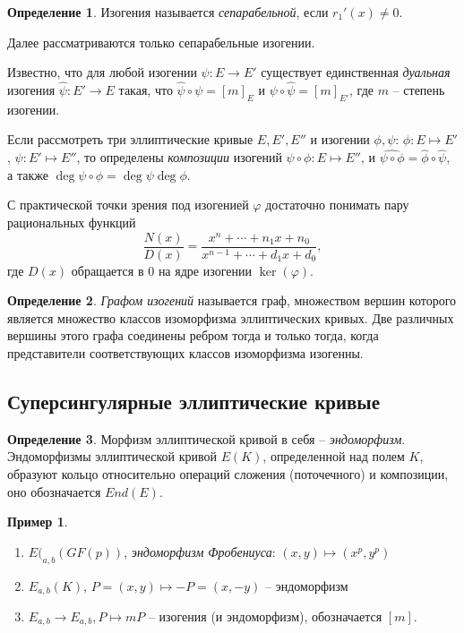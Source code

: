 \documentclass[a4paper,12pt]{article}
\theoremstyle{definition}
\newtheorem{definition}{Определение}
\newtheorem{example}{Пример}
\begin{document}
\begin{definition}
Изогения называется \emph{сепарабельной}, если $r_1'(x)\neq 0$.
\end{definition}

Далее рассматриваются только сепарабельные изогении.

Известно, что  для любой  изогении $ \psi:E\to E'$   существует единственная \emph{дуальная} изогения $\hat{\psi}:E'\to E$ такая, что $\hat{\psi}\circ \psi=[m]_E$ и $\psi\circ\hat{\psi}=[m]_{E'}$, где $m$ -- {степень} изогении.

Если рассмотреть три эллиптические кривые $E,E',E''$ и изогении $\phi,\psi$: $\phi:E\mapsto E'$, $\psi:E'\mapsto E''$,
то определены \emph{композиции} изогений $\psi\circ\phi:E\mapsto E''$, и $\widehat{\psi\circ\phi}=\hat{\phi}\circ\hat{\psi}$, а также $\deg \psi\circ\phi=\deg\psi \deg\phi$.

С практической точки зрения под изогенией $\varphi$ достаточно понимать пару рациональных функций
$$
\frac{N(x)}{D(x)}=\frac{x^n+\cdots+n_1x+n_0}{x^{n-1}+\cdots+d_1x+d_0},
$$
где $D(x)$ обращается в $0$ на ядре изогении $\ker(\varphi)$.

\begin{definition}
\emph{Графом изогений} называется граф, множеством вершин которого является множество классов изоморфизма эллиптических кривых. 
Две различных вершины этого графа соединены ребром тогда и только тогда, когда представители соответствующих классов изоморфизма изогенны.
\end{definition}

\subsection{Суперсингулярные эллиптические кривые}

\begin{definition}
Морфизм эллиптической кривой в себя -- \emph{эндоморфизм}.
Эндоморфизмы эллиптической кривой $E(K)$, определенной над полем $K$, образуют кольцо относительно операций сложения (поточечного) и композиции, оно обозначается $End(E)$. 
\end{definition}

\begin{example}
\begin{enumerate}

\item $E(_{a,b}(GF(p))$, \emph{эндоморфизм Фробениуса}: $(x,y)\mapsto (x^p,y^p)$

\item $E_{a,b}(K)$, $P=(x,y)\mapsto -P=(x,-y)$ -- эндоморфизм

\item $E_{a,b}\to E_{a,b}, P\mapsto mP$ -- изогения (и эндоморфизм), обозначается $[m]$.
\end{enumerate}
\end{example}
\end{document}
